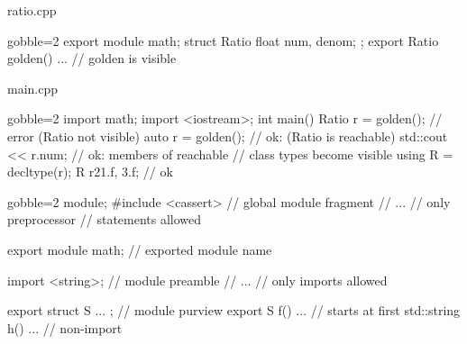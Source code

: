\begin{frame}[fragile]
  \begin{exampleblock}{ratio.cpp}
    \begin{cppcode*}{gobble=2}
      export module math;
      struct Ratio { float num, denom; };
      export Ratio golden() { ... } // golden is visible
    \end{cppcode*}
  \end{exampleblock}
  \begin{exampleblock}{main.cpp}
    \begin{cppcode*}{gobble=2}
      import math;
      import <iostream>;
      int main() {
        Ratio r = golden(); // error (Ratio not visible)
        auto r = golden();  // ok: (Ratio is reachable)
        std::cout << r.num; // ok: members of reachable
                            // class types become visible
        using R = decltype(r);
        R r2{1.f, 3.f};     // ok
      }
    \end{cppcode*}
  \end{exampleblock}
\end{frame}

\begin{frame}[fragile]
  \begin{exampleblock}{}
    \begin{cppcode*}{gobble=2}
      module;
      #include <cassert>       // global module fragment
      // ...                   //   only preprocessor
                               //   statements allowed

      export module math;      // exported module name

      import <string>;         // module preamble
      // ...                   //   only imports allowed

      export struct S { ... }; // module purview
      export S f() { ... }     //  starts at first
      std::string h() { ... }  //  non-import
    \end{cppcode*}
  \end{exampleblock}
\end{frame}

